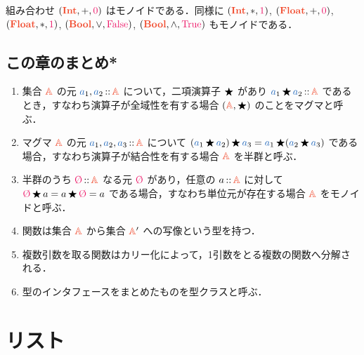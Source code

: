 \documentclass[a5paper,twoside,fleqn,draft]{jsbook}
\begin{document}
組み合わせ $(\mIntType,+,\hConstant{0})$ はモノイドである．同様に $(\mIntType,*,\hConstant{1})$, $(\mFloatType,+,\hConstant{0})$, $(\mFloatType,*,\hConstant{1})$, $(\mBoolType,\mLogicalOr,\hFalse)$, $(\mBoolType,\mLogicalAnd,\hTrue)$ もモノイドである．


\section{この章のまとめ*}

\begin{enumerate}
\item 集合 $\mASet$ の元 $\hVar{a}_1,\hVar{a}_2\mIn\mASet$ について，二項演算子 $\operatorname{\bigstar}$ があり $\hVar{a}_1\hAnyBinOp \hVar{a}_2\mIn\mASet$ であるとき，すなわち演算子が全域性を有する場合 $(\mASet,\hAnyBinOp)$ のことをマグマと呼ぶ．
\item マグマ $\mASet$ の元 $\hVar{a}_1,\hVar{a}_2,\hVar{a}_3\mIn\mASet$ について $(\hVar{a}_1\hAnyBinOp \hVar{a}_2)\hAnyBinOp \hVar{a}_3=\hVar{a}_1\hAnyBinOp(\hVar{a}_2\hAnyBinOp \hVar{a}_3)$ である場合，すなわち演算子が結合性を有する場合 $\mASet$ を半群と呼ぶ．
\item 半群のうち $\mZero\mIn\mASet$ なる元 $\mZero$ があり，任意の $a\mIn\mASet$ に対して $\mZero\hAnyBinOp a=a\hAnyBinOp\mZero=a$ である場合，すなわち単位元が存在する場合 $\mASet$ をモノイドと呼ぶ．
\item 関数は集合 $\mASet$ から集合 $\mASet'$ への写像という型を持つ．
\item 複数引数を取る関数はカリー化によって，1引数をとる複数の関数へ分解される．
\item 型のインタフェースをまとめたものを型クラスと呼ぶ．
\end{enumerate}

\chapter{リスト}
\label{ch:list}
\end{document}
